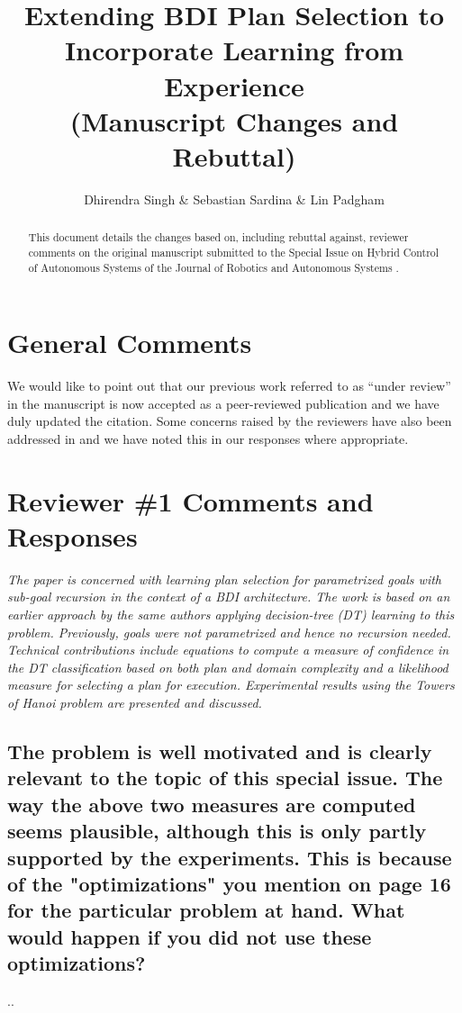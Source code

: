 \documentclass[preprint,12pt]{elsarticle}
\title{Extending BDI Plan Selection to Incorporate Learning from Experience\\(Manuscript Changes and Rebuttal)}
\author{Dhirendra Singh \& Sebastian Sardina \& Lin Padgham}
\begin{document}
\begin{abstract}
This document details the changes based on, including rebuttal against, reviewer comments on the original manuscript submitted to the Special Issue on Hybrid Control of Autonomous Systems of the Journal of Robotics and Autonomous Systems \cite{Singh:HYCAS10}.    
\end{abstract}

\maketitle

\section{General Comments}

We would like to point out that our previous work referred to as ``under review'' in the manuscript  is now accepted as a peer-reviewed publication \cite{Singh:AAMAS10} and we have duly updated the citation. Some concerns raised by the reviewers have also been addressed in \cite{Singh:AAMAS10} and we have noted this in our responses where appropriate.

\section{Reviewer \#1 Comments and Responses}

{\em The paper is concerned with learning plan selection for parametrized goals with sub-goal recursion in the context of a BDI architecture. The work is based on an earlier approach by the same authors applying decision-tree (DT) learning to this problem. Previously, goals were not parametrized and hence no recursion needed. Technical contributions include equations to compute a measure of confidence in the DT classification based on both plan and domain complexity and a likelihood measure for selecting a plan for execution. Experimental results using the Towers of Hanoi problem are presented and discussed.}


\subsection{ The problem is well motivated and is clearly relevant to the topic of this special issue. The way the above two measures are computed seems plausible, although this is only partly supported by the experiments. This is because of the "optimizations" you mention on page 16 for the particular problem at hand. What would happen if you did not use these optimizations?}
\label{rev1:optimisations}
..
\end{document}
